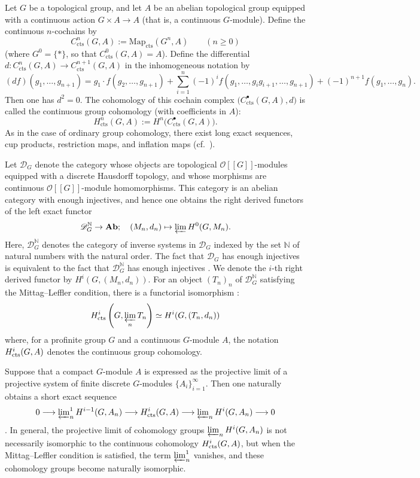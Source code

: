 \documentclass{article}
\numberwithin{equation}{section} %
\begin{document}
        Let $G$ be a topological group, and let $A$ be an abelian topological group equipped with a continuous action $G\times A\to A$ (that is, a continuous $G$-module). Define the continuous $n$-cochains by
\[
  C^n_{\mathrm{cts}}(G,A):=\mathrm{Map}_{\mathrm{cts}}(G^n,A)
  \qquad (n\ge 0)
\]
(where $G^0=\{*\}$, so that $C^0_{\mathrm{cts}}(G,A)=A$).
Define the differential $d\colon C^n_{\mathrm{cts}}(G,A)\to C^{n+1}_{\mathrm{cts}}(G,A)$ in the inhomogeneous notation by
\[
  (df)(g_1,\dots,g_{n+1})
  =
  g_1\cdot f(g_2,\dots,g_{n+1})
  +\sum_{i=1}^{n}(-1)^i
  f(g_1,\dots,g_i g_{i+1},\dots,g_{n+1})
  +(-1)^{n+1} f(g_1,\dots,g_n).
\]
Then one has $d^2=0$.
The cohomology of this cochain complex $\bigl(C^\bullet_{\mathrm{cts}}(G,A),d\bigr)$ is called the continuous group cohomology (with coefficients in $A$):
\[
  H^n_{\mathrm{cts}}(G,A)
  :=
  H^n\bigl(C^\bullet_{\mathrm{cts}}(G,A)\bigr).
\]
As in the case of ordinary group cohomology, there exist long exact sequences, cup products, restriction maps, and inflation maps (cf.~\cite[Section~2.7]{NSW}).
\fi

Let $\mathscr{D}_G$ denote the category whose objects are topological $\mathcal{O}[[G]]$-modules equipped with a discrete Hausdorff topology, and whose morphisms are continuous $\mathcal{O}[[G]]$-module homomorphisms. This category is an abelian category with enough injectives, and hence one obtains the right derived functors of the left exact functor
\[
  \mathscr{D}_G^{\mathbb{N}}
  \to
  \mathbf{Ab};
  \quad
  (M_n,d_n)
  \mapsto
  \varprojlim H^0(G,M_n).
\]
Here, $\mathscr{D}_G^{\mathbb{N}}$ denotes the category of inverse systems in $\mathscr{D}_G$ indexed by the set $\mathbb{N}$ of natural numbers with the natural order. The fact that $\mathscr{D}_G$ has enough injectives is equivalent to the fact that $\mathscr{D}_G^{\mathbb{N}}$ has enough injectives \cite[(1.1) Proposition]{Jannsen}. We denote the $i$-th right derived functor by $H^i(G,(M_n,d_n))$. For an object $(T_n)_n$ of $\mathscr{D}_G^{\mathbb{N}}$ satisfying the Mittag--Leffler condition, there is a functorial isomorphism \cite[(2.2) Theorem]{Jannsen}:
\[
  H^i_{\rm cts}\left(G,\varprojlim_n T_n\right)
  \simeq
  H^i(G,(T_n,d_n))
\]
where, for a profinite group $G$ and a continuous $G$-module $A$, the notation $H^i_{\rm cts}(G,A)$ denotes the continuous group cohomology.


Suppose that a compact $G$-module $A$ is expressed as the projective limit of a projective system of finite discrete $G$-modules $\{A_i\}_{i=1}^\infty$. Then one naturally obtains a short exact sequence
        \[
          0
          \longrightarrow
          \varprojlim\nolimits_n^1 H^{i-1}(G,A_n)
          \longrightarrow
          H^i_{\rm cts}(G,A)
          \longrightarrow
          \varprojlim\nolimits_n H^i(G,A_n)
          \longrightarrow
          0
        \]
        \cite[Theorem~2.7.5]{NSW}. In general, the projective limit of cohomology groups $\varprojlim\nolimits_n H^i(G,A_n)$ is not necessarily isomorphic to the continuous cohomology $H^i_{\rm cts}(G,A)$, but when the Mittag--Leffler condition is satisfied, the term $\varprojlim\nolimits_n^1$ vanishes, and these cohomology groups become naturally isomorphic.
\end{document}

